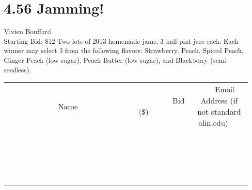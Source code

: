 \documentclass[11pt]{article}
\begin{document}
\section*{4.56 Jamming!}
Vivien Bouffard
\\
Starting Bid: \$12
\newline
Two lots of 2013 homemade jams, 3 half-pint jars each.  Each winner may select 3 from the following flavors:  Strawberry, Peach, Spiced Peach, Ginger Peach (low sugar), Peach Butter (low sugar), and Blackberry (semi-seedless).
\\[3ex]
\begin{tabular}{c c c}
~~~~~~~~~~~~~Name~~~~~~~~~~~~~ & ~~~~~~~~~Bid (\$)~~~~~~~~~  & ~~~Email Address (if not standard olin.edu)~~~\\
 & & \\
\hline
 & & \\
\hline
 & & \\
\hline
 & & \\
\hline
 & & \\
\hline
 & & \\
\hline
 & & \\
\hline
 & & \\
\hline
 & & \\
\hline
 & & \\
\hline
 & & \\
\hline
 & & \\
\hline
 & & \\
\hline
 & & \\
\hline
 & & \\
\hline
 & & \\
\hline
 & & \\
\hline
 & & \\
\hline
 & & \\
\hline
\end{tabular}
\newpage
\end{document}
